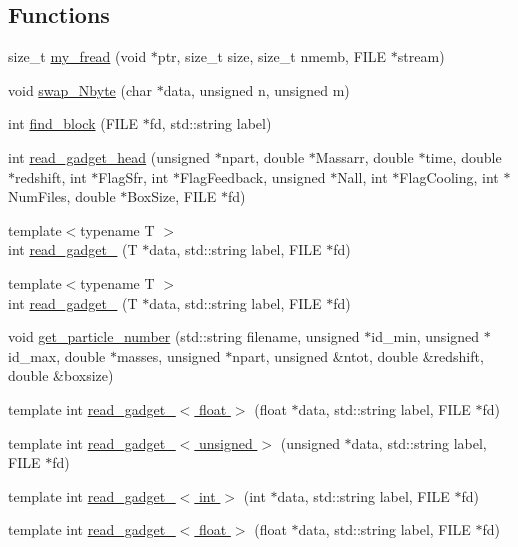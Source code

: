 \subsection*{Functions}
\begin{DoxyCompactItemize}
\item 
size\_\-t \hyperlink{ReadGadget_8c_a1609620c03f6b0068601735c42e3c660}{my\_\-fread} (void $\ast$ptr, size\_\-t size, size\_\-t nmemb, FILE $\ast$stream)
\item 
void \hyperlink{ReadGadget_8c_a972ae715f1bbaf7462f7c87b18e290a8}{swap\_\-Nbyte} (char $\ast$data, unsigned n, unsigned m)
\item 
int \hyperlink{ReadGadget_8c_acd254afd3ef5345fbda710dc1e9fc3b8}{find\_\-block} (FILE $\ast$fd, std::string label)
\item 
int \hyperlink{ReadGadget_8c_ad9d50e7b7a2074ee223624fca3096827}{read\_\-gadget\_\-head} (unsigned $\ast$npart, double $\ast$Massarr, double $\ast$time, double $\ast$redshift, int $\ast$FlagSfr, int $\ast$FlagFeedback, unsigned $\ast$Nall, int $\ast$FlagCooling, int $\ast$NumFiles, double $\ast$BoxSize, FILE $\ast$fd)
\item 
{\footnotesize template$<$typename T $>$ }\\int \hyperlink{ReadGadget_8c_a82dcfc276c58b845497a7ac210b79fa4}{read\_\-gadget\_} (T $\ast$data, std::string label, FILE $\ast$fd)
\item 
{\footnotesize template$<$typename T $>$ }\\int \hyperlink{ReadGadget_8c_ad94fb9be5ec96b09a94fa083db81463c}{read\_\-gadget\_} (T $\ast$data, std::string label, FILE $\ast$fd)
\item 
void \hyperlink{ReadGadget_8c_a275b45dee34efc2ef2f3bb402ca17993}{get\_\-particle\_\-number} (std::string filename, unsigned $\ast$id\_\-min, unsigned $\ast$id\_\-max, double $\ast$masses, unsigned $\ast$npart, unsigned \&ntot, double \&redshift, double \&boxsize)
\item 
template int \hyperlink{ReadGadget_8c_a96e0e7ef9404aff1c1d5268061c22d71}{read\_\-gadget\_$<$ float $>$} (float $\ast$data, std::string label, FILE $\ast$fd)
\item 
template int \hyperlink{ReadGadget_8c_a4b28139a89375c3cfd883bc092a94155}{read\_\-gadget\_$<$ unsigned $>$} (unsigned $\ast$data, std::string label, FILE $\ast$fd)
\item 
template int \hyperlink{ReadGadget_8c_a25edfa812b5ae7d4d1fd1b722cef6711}{read\_\-gadget\_$<$ int $>$} (int $\ast$data, std::string label, FILE $\ast$fd)
\item 
template int \hyperlink{ReadGadget_8c_a6f380edaefe7fe279c4e23234e0ec413}{read\_\-gadget\_$<$ float $>$} (float $\ast$data, std::string label, FILE $\ast$fd)
\end{DoxyCompactItemize}
